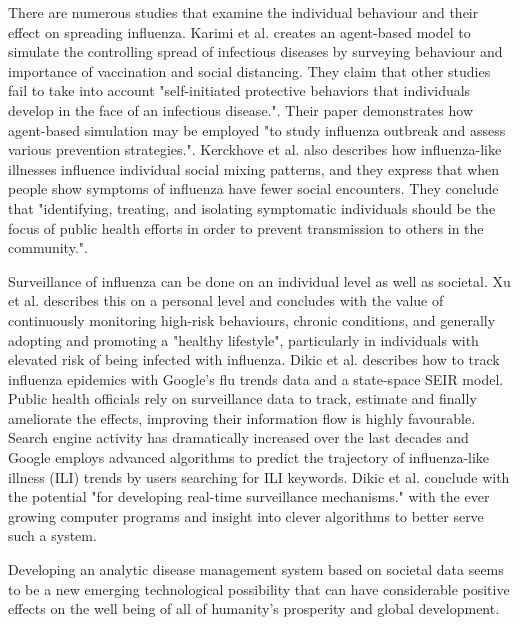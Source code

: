 There are numerous studies that examine the individual behaviour and their effect on spreading influenza. Karimi et al.\cite{karimi2015effect} creates an agent-based model to simulate the controlling spread of infectious diseases by surveying behaviour and importance of vaccination and social distancing. They claim that other studies fail to take into account "self-initiated protective behaviors that individuals develop in the face of an infectious disease.". Their paper demonstrates how agent-based simulation may be employed "to study influenza outbreak and assess various prevention strategies.". Kerckhove et al.\cite{van2013impact} also describes how influenza-like illnesses influence individual social mixing patterns, and they express that when people show symptoms of influenza have fewer social encounters. 
They conclude that "identifying, treating, and isolating symptomatic individuals should be the focus of public health efforts in order to prevent transmission to others in the community.".

Surveillance of influenza can be done on an individual level as well as societal. Xu et al.\cite{xu2014surveillance} describes this on a personal level and concludes with the value of continuously monitoring high-risk behaviours, chronic conditions, and generally adopting and promoting a "healthy lifestyle", particularly in individuals with elevated risk of being infected with influenza. Dikic et al.\cite{dukic2012tracking} describes how to track influenza epidemics with Google's flu trends\cite{google_flu_trends} data and a state-space SEIR model. Public health officials rely on surveillance data to track, estimate and finally ameliorate the effects, improving their information flow is highly favourable. Search engine activity has dramatically increased over the last decades and Google employs advanced algorithms to predict the trajectory of influenza-like illness (ILI) trends by users searching for ILI keywords. Dikic et al. conclude with the potential "for developing real-time surveillance mechanisms." with the ever growing computer programs and insight into clever algorithms to better serve such a system.

Developing an analytic disease management system based on societal data seems to be a new emerging technological possibility that can have considerable positive effects on the well being of all of humanity's prosperity and global development.






